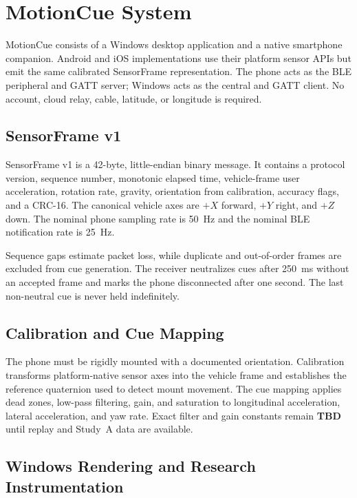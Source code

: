 \section{MotionCue System}
\label{sec:system}

MotionCue consists of a Windows desktop application and a native smartphone companion. Android and iOS implementations use their platform sensor APIs but emit the same calibrated SensorFrame representation. The phone acts as the BLE peripheral and GATT server; Windows acts as the central and GATT client. No account, cloud relay, cable, latitude, or longitude is required.

\subsection{SensorFrame v1}

SensorFrame v1 is a 42-byte, little-endian binary message. It contains a protocol version, sequence number, monotonic elapsed time, vehicle-frame user acceleration, rotation rate, gravity, orientation from calibration, accuracy flags, and a CRC-16. The canonical vehicle axes are $+X$ forward, $+Y$ right, and $+Z$ down. The nominal phone sampling rate is 50~Hz and the nominal BLE notification rate is 25~Hz.

Sequence gaps estimate packet loss, while duplicate and out-of-order frames are excluded from cue generation. The receiver neutralizes cues after 250~ms without an accepted frame and marks the phone disconnected after one second. The last non-neutral cue is never held indefinitely.

\subsection{Calibration and Cue Mapping}

The phone must be rigidly mounted with a documented orientation. Calibration transforms platform-native sensor axes into the vehicle frame and establishes the reference quaternion used to detect mount movement. The cue mapping applies dead zones, low-pass filtering, gain, and saturation to longitudinal acceleration, lateral acceleration, and yaw rate. Exact filter and gain constants remain \textbf{TBD} until replay and Study~A data are available.

\subsection{Windows Rendering and Research Instrumentation}

